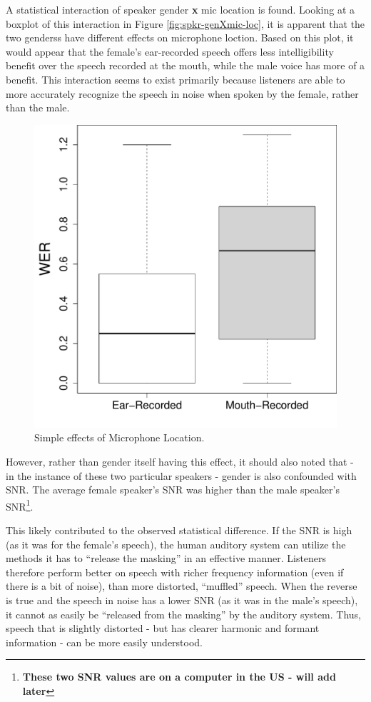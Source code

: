 \documentclass[dissertation,copyright]{uathesis}
\makeatletter
\def\maxwidth{ %
  \ifdim\Gin@nat@width>\linewidth
    \linewidth
  \else
    \Gin@nat@width
  \fi
}
\makeatother
\begin{document}
A statistical interaction of speaker gender \textbf{x} mic location is found.  
Looking at a boxplot of this interaction in Figure \ref{fig:spkr-genXmic-loc}, it is apparent that the two genderss have different effects on microphone loction.  Based on this plot, it would appear that the female's ear-recorded speech offers less intelligibility benefit over the speech recorded at the mouth, while the male voice has more of a benefit.  This interaction seems to exist primarily because listeners are able to more accurately recognize the speech in noise when spoken by the female, rather than the male.
%
\begin{figure}

\includegraphics[width=\maxwidth]{figure/Mic-location_simple-1} 

\caption{Simple effects of Microphone Location.}
\label{fig:mic_loc_simple}
\end{figure}
%
However, rather than gender itself having this effect, it should also noted that - in the instance of these two particular speakers - gender is also confounded with SNR.  The average female speaker's SNR was higher than the male speaker's SNR\footnote{\textbf{These two SNR values are on a computer in the US - will add later}}.


This likely contributed to the observed statistical difference.  If the SNR is high (as it was for the female's speech), the human auditory system can utilize the methods it has to ``release the masking'' in an effective manner.  Listeners therefore perform better on speech with richer frequency information (even if there is a bit of noise), than more distorted, ``muffled'' speech.  When the reverse is true and the speech in noise has a lower SNR (as it was in the male's speech), it cannot as easily be ``released from the masking'' by the auditory system.  Thus, speech that is slightly distorted - but has clearer harmonic and formant information - can be more easily understood.
\end{document}
